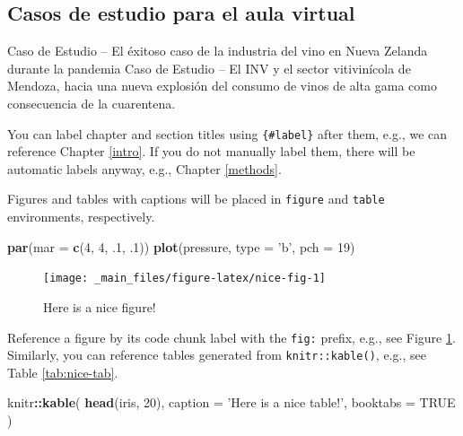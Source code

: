 \documentclass[]{article}
\newenvironment{Shaded}{\begin{snugshade}}{\end{snugshade}}
\newcommand{\KeywordTok}[1]{\textcolor[rgb]{0.13,0.29,0.53}{\textbf{#1}}}
\newcommand{\DataTypeTok}[1]{\textcolor[rgb]{0.13,0.29,0.53}{#1}}
\newcommand{\DecValTok}[1]{\textcolor[rgb]{0.00,0.00,0.81}{#1}}
\newcommand{\StringTok}[1]{\textcolor[rgb]{0.31,0.60,0.02}{#1}}
\newcommand{\OtherTok}[1]{\textcolor[rgb]{0.56,0.35,0.01}{#1}}
\newcommand{\OperatorTok}[1]{\textcolor[rgb]{0.81,0.36,0.00}{\textbf{#1}}}
\newcommand{\NormalTok}[1]{#1}
\begin{document}
\subsection{Casos de estudio para el aula
virtual}\label{casos-de-estudio-para-el-aula-virtual}

Caso de Estudio -- El éxitoso caso de la industria del vino en Nueva
Zelanda durante la pandemia Caso de Estudio -- El INV y el sector
vitivinícola de Mendoza, hacia una nueva explosión del consumo de vinos
de alta gama como consecuencia de la cuarentena.

You can label chapter and section titles using \texttt{\{\#label\}}
after them, e.g., we can reference Chapter \ref{intro}. If you do not
manually label them, there will be automatic labels anyway, e.g.,
Chapter \ref{methods}.

Figures and tables with captions will be placed in \texttt{figure} and
\texttt{table} environments, respectively.

\begin{Shaded}
\begin{Highlighting}[]
\KeywordTok{par}\NormalTok{(}\DataTypeTok{mar =} \KeywordTok{c}\NormalTok{(}\DecValTok{4}\NormalTok{, }\DecValTok{4}\NormalTok{, .}\DecValTok{1}\NormalTok{, .}\DecValTok{1}\NormalTok{))}
\KeywordTok{plot}\NormalTok{(pressure, }\DataTypeTok{type =} \StringTok{'b'}\NormalTok{, }\DataTypeTok{pch =} \DecValTok{19}\NormalTok{)}
\end{Highlighting}
\end{Shaded}

\begin{figure}

{\centering \texttt{[image: \_main\_files/figure-latex/nice-fig-1]} 

}

\caption{Here is a nice figure!}\label{fig:nice-fig}
\end{figure}

Reference a figure by its code chunk label with the \texttt{fig:}
prefix, e.g., see Figure \ref{fig:nice-fig}. Similarly, you can
reference tables generated from \texttt{knitr::kable()}, e.g., see Table
\ref{tab:nice-tab}.

\begin{Shaded}
\begin{Highlighting}[]
\NormalTok{knitr}\OperatorTok{::}\KeywordTok{kable}\NormalTok{(}
  \KeywordTok{head}\NormalTok{(iris, }\DecValTok{20}\NormalTok{), }\DataTypeTok{caption =} \StringTok{'Here is a nice table!'}\NormalTok{,}
  \DataTypeTok{booktabs =} \OtherTok{TRUE}
\NormalTok{)}
\end{Highlighting}
\end{Shaded}
\end{document}
